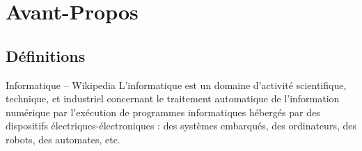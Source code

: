 \def\xxactivite{Cours}

\fichefalse \proftrue \tdfalse \courstrue

\def\xxnumchapitre{Chapitre 1 \vspace{.2cm}}
\def\xxchapitre{\hspace{.12cm} Découverte de l'algorithmique et de la programmation}

\def\xxcompetences{%
\textsl{%
\textbf{Savoirs et compétences :}\\
\begin{itemize}[label=\ding{112},font=\color{bleuxp}] 
\item Choisir un type de variable.
\item Concevoir un algorithme utilisant une structure conditionnelle (Si), une structure itérative (while), une structure itérative (for).
\item Concevoir une fonction.
\item  Manipuler des listes.
\item Instruction et expression.
\end{itemize}
}}

\def\xxfigures{
}%


\setlength{\columnseprule}{.1pt}

\vspace{2cm}
\pagestyle{fancy}
\thispagestyle{plain}



\section{Avant-Propos}
\subsection{Définitions}

\begin{defi}{Informatique -- Wikipedia}
L'informatique est un domaine d'activité scientifique, technique, et industriel concernant le traitement automatique de l'information numérique par l'exécution de programmes informatiques hébergés par des dispositifs électriques-électroniques : des systèmes embarqués, des ordinateurs, des robots, des automates, etc.
\end{defi}

